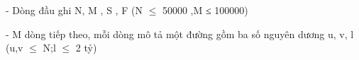- Dòng đầu ghi N, M , S , F (N $\le$  50000 ,M ≤ 100000)   


   - M dòng tiếp theo, mỗi dòng mô tả một đường gồm ba số nguyên dương u, v, l (u,v $\le$ N;l $\le$ 2 tỷ)